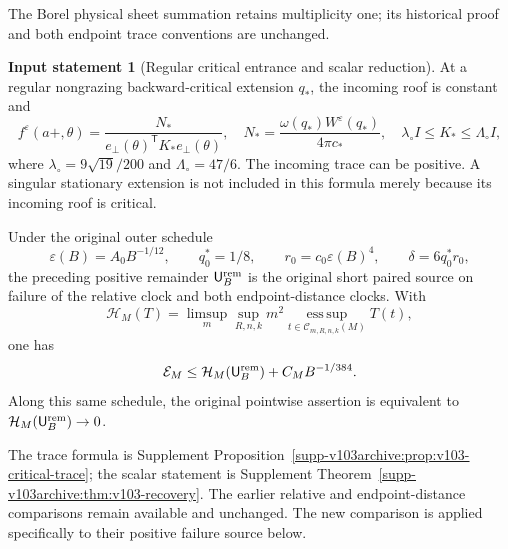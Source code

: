 \documentclass[11pt,reqno]{amsart}
\numberwithin{equation}{section}
\theoremstyle{definition}\newtheorem{definition}[theorem]{Definition}
\newtheorem{inputstatement}[theorem]{Input statement}
\theoremstyle{remark}\newtheorem{remark}[theorem]{Remark}
\newcommand{\esssup}{\operatorname*{ess\,sup}}
\begin{document}
The Borel physical sheet summation retains multiplicity one; its
historical proof and both endpoint trace conventions are unchanged.

\begin{inputstatement}[Regular critical entrance and scalar reduction]
\label{input:v104-scalar}
At a regular nongrazing backward-critical extension $q_*$, the
incoming roof is constant and
\begin{equation}\label{eq:v104-critical-input}
 f^\varepsilon(a+,\theta)
 =\frac{N_*}{e_\perp(\theta)^{\mathsf T}K_*e_\perp(\theta)},
 \quad N_*=\frac{\omega(q_*)W^\varepsilon(q_*)}{4\pi c_*},
 \quad \lambda_\circ I\le K_*\le\Lambda_\circ I,
\end{equation}
where $\lambda_\circ=9\sqrt{19}/200$ and $\Lambda_\circ=47/6$.
The incoming trace can be positive. A singular stationary extension
is not included in this formula merely because its incoming roof
is critical.

Under the original outer schedule
\begin{equation}\label{eq:v104-schedule}
 \varepsilon(B)=A_0B^{-1/12},\qquad q_0^*=1/8,\qquad
 r_0=c_0\varepsilon(B)^4,\qquad\delta=6q_0^*r_0,
\end{equation}
the preceding positive remainder $\mathsf U_B^{\rm rem}$ is the
original short paired source on failure of the relative clock and
both endpoint-distance clocks. With
\[
 \mathcal H_M(T)=\limsup_m\sup_{R,n,k}m^2
       \esssup_{t\in\mathcal C_{m,R,n,k}(M)}T(t),
\]
one has
\begin{equation}\label{eq:v104-old-remainder}
 \mathcal E_M\le\mathcal H_M(\mathsf U_B^{\rm rem})
                                       +C_MB^{-1/384}.
\end{equation}
Along this same schedule, the original pointwise assertion is
equivalent to $\mathcal H_M(\mathsf U_B^{\rm rem})\to0$.
\end{inputstatement}
The trace formula is Supplement
Proposition~\ref{supp-v103archive:prop:v103-critical-trace}; the
scalar statement is Supplement Theorem~\ref{supp-v103archive:thm:v103-recovery}.
The earlier relative and endpoint-distance comparisons remain
available and unchanged. The new comparison is applied specifically
to their positive failure source below.












\appendix




\end{document}
